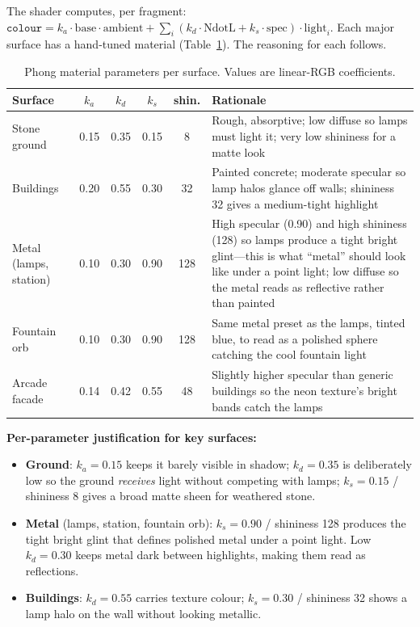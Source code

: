 \documentclass[10pt,a4paper]{article}
\begin{document}
The shader computes, per fragment:
$\texttt{colour} = k_a \cdot \text{base} \cdot \text{ambient} + \sum_i (k_d \cdot
\text{NdotL} + k_s \cdot \text{spec}) \cdot \text{light}_i$.
Each major surface has a hand-tuned material (Table~\ref{tab:materials}). The reasoning
for each follows.

\begin{table}[H]
  \centering
  \caption{Phong material parameters per surface. Values are linear-RGB coefficients.}
  \label{tab:materials}
  \begin{tabularx}{\textwidth}{@{}lccccX@{}}
    \toprule
    \textbf{Surface} & $k_a$ & $k_d$ & $k_s$ & \textbf{shin.} & \textbf{Rationale} \\
    \midrule
    Stone ground  & 0.15 & 0.35 & 0.15 & 8   & Rough, absorptive; low diffuse so lamps must light it; very low shininess for a matte look \\
    Buildings     & 0.20 & 0.55 & 0.30 & 32  & Painted concrete; moderate specular so lamp halos glance off walls; shininess 32 gives a medium-tight highlight \\
    Metal (lamps, station) & 0.10 & 0.30 & 0.90 & 128 & High specular (0.90) and high shininess (128) so lamps produce a tight bright glint---this is what ``metal'' should look like under a point light; low diffuse so the metal reads as reflective rather than painted \\
    Fountain orb & 0.10 & 0.30 & 0.90 & 128 & Same metal preset as the lamps, tinted blue, to read as a polished sphere catching the cool fountain light \\
    Arcade facade & 0.14 & 0.42 & 0.55 & 48 & Slightly higher specular than generic buildings so the neon texture's bright bands catch the lamps \\
    \bottomrule
  \end{tabularx}
\end{table}

\textbf{Per-parameter justification for key surfaces:}

\begin{itemize}[leftmargin=*, nosep]
  \item \textbf{Ground}: $k_a{=}0.15$ keeps it barely visible in shadow; $k_d{=}0.35$ is
    deliberately low so the ground \emph{receives} light without competing with lamps;
    $k_s{=}0.15$ / shininess 8 gives a broad matte sheen for weathered stone.
  \item \textbf{Metal} (lamps, station, fountain orb): $k_s{=}0.90$ / shininess 128
    produces the tight bright glint that defines polished metal under a point light. Low
    $k_d{=}0.30$ keeps metal dark between highlights, making them read as reflections.
  \item \textbf{Buildings}: $k_d{=}0.55$ carries texture colour; $k_s{=}0.30$ /
    shininess 32 shows a lamp halo on the wall without looking metallic.
\end{itemize}
\end{document}
